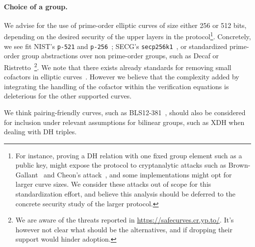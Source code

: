 \documentclass[runningheads]{llncs}
\begin{document}
\paragraph{Choice of a group.} We advise for the use of prime-order elliptic curves of size either 256 or 512 bits, depending on the desired security of the upper layers in the protocol\footnote{For instance, proving a DH relation with one fixed group element such as a public key, might expose the protocol to cryptanalytic attacks such as Brown-Gallant~\cite{EPRINT:BroGal04} and Cheon’s attack~\cite{EC:Cheon06}, and some implementations might opt for larger curve sizes. We consider these attacks out of scope for this standardization effort, and believe this analysis should be deferred to the concrete security study of the larger protocol.}.
Concretely, we see fit NIST's \verb|p-521| and \verb|p-256|~\cite{fips2}; SECG's \verb|secp256k1|~\cite{SECG}, or standardized prime-order group abstractions over non prime-order groups, such as Decaf or Ristretto~\cite{C:Hamburg15,cfrg-ristretto-decaf}\footnote{We are aware of the threats reported in
\url{https://safecurves.cr.yp.to/}.
It's however not clear what should be the alternatives, and if dropping their support would hinder adoption.
}.
We note that there exists already standards for removing small cofactors in elliptic curves~\cite{rfc2785}.
However we believe that the complexity added by integrating the handling of the cofactor within the verification equations is deleterious for the other supported curves.

We think pairing-friendly curves, such as BLS12-381~\cite{bls12}, should also be considered for inclusion under relevant assumptions for bilinear groups, such as XDH when dealing with DH triples.
\end{document}
